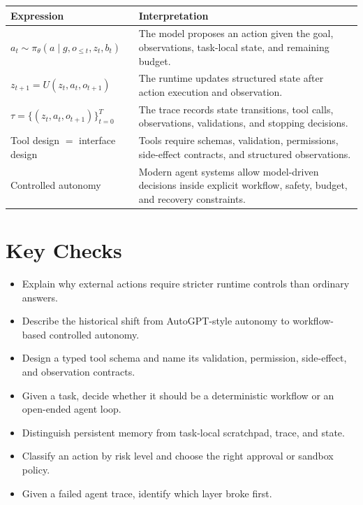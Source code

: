 \begin{center}
\begin{tabularx}{\textwidth}{@{}lX@{}}
\toprule
\textbf{Expression} & \textbf{Interpretation} \\
\midrule
$a_t \sim \pi_\theta(a \mid g, o_{\leq t}, z_t, b_t)$ & The model proposes an action given the goal, observations, task-local state, and remaining budget. \\
$z_{t+1} = U(z_t, a_t, o_{t+1})$ & The runtime updates structured state after action execution and observation. \\
$\tau = \{(z_t, a_t, o_{t+1})\}_{t=0}^{T}$ & The trace records state transitions, tool calls, observations, validations, and stopping decisions. \\
Tool design $=$ interface design & Tools require schemas, validation, permissions, side-effect contracts, and structured observations. \\
Controlled autonomy & Modern agent systems allow model-driven decisions inside explicit workflow, safety, budget, and recovery constraints. \\
\bottomrule
\end{tabularx}
\end{center}

\section*{Key Checks}

\begin{itemize}
  \item Explain why external actions require stricter runtime controls than ordinary answers.
  \item Describe the historical shift from AutoGPT-style autonomy to workflow-based controlled autonomy.
  \item Design a typed tool schema and name its validation, permission, side-effect, and observation contracts.
  \item Given a task, decide whether it should be a deterministic workflow or an open-ended agent loop.
  \item Distinguish persistent memory from task-local scratchpad, trace, and state.
  \item Classify an action by risk level and choose the right approval or sandbox policy.
  \item Given a failed agent trace, identify which layer broke first.
\end{itemize}


